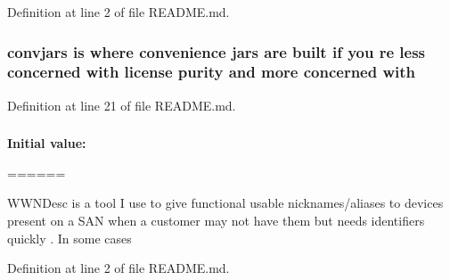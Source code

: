 \-Definition at line 2 of file \-R\-E\-A\-D\-M\-E.\-md.

\subsubsection[{with}]{\setlength{\rightskip}{0pt plus 5cm}convjars is where convenience jars are built if you re less concerned {\bf with} license purity and more concerned {\bf with}}\label{README_8md_ae60a2d308c5ca3174e539317e8ef5302}


\-Definition at line 21 of file \-R\-E\-A\-D\-M\-E.\-md.

\subsubsection[{wwndesc}]{}\label{README_8md_ad984e9098af78a1a6e7a70ef8e1428bd}
{\bfseries \-Initial value\-:}
\begin{DoxyCode}
======

WWNDesc is a tool I use to give functional usable nicknames/aliases to devices 
      present on a SAN when a customer may not have them but needs identifiers quickly
      .  In some cases
\end{DoxyCode}


\-Definition at line 2 of file \-R\-E\-A\-D\-M\-E.\-md.

